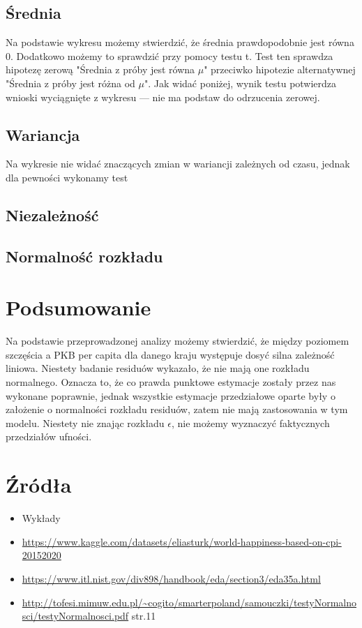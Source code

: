 \documentclass{article}
\theoremstyle{break}
\begin{document}
	\subsection{Średnia}
	Na podstawie wykresu możemy stwierdzić, że średnia prawdopodobnie jest równa 0. Dodatkowo możemy to sprawdzić przy pomocy testu t. Test ten sprawdza hipotezę zerową "Średnia z próby jest równa $\mu$" przeciwko hipotezie alternatywnej "Średnia z próby jest różna od $\mu$". Jak widać poniżej, wynik testu potwierdza wnioski wyciągnięte z wykresu — nie ma podstaw do odrzucenia zerowej.
	
	\subsection{Wariancja}
	Na wykresie nie widać znaczących zmian w wariancji zależnych od czasu, jednak dla pewności wykonamy test 
	
	\subsection{Niezależność}
	
	\subsection{Normalność rozkładu}
	
	
	\section{Podsumowanie}
	
	Na podstawie przeprowadzonej analizy możemy stwierdzić, że między poziomem szczęścia a PKB per capita dla danego kraju występuje dosyć silna zależność liniowa. Niestety badanie residuów wykazało, że nie mają one rozkładu normalnego. Oznacza to, że co prawda punktowe estymacje zostały przez nas wykonane poprawnie, jednak wszystkie estymacje przedziałowe oparte były o założenie o normalności rozkładu residuów, zatem nie mają zastosowania w tym modelu. Niestety nie znając rozkładu $\epsilon$, nie możemy wyznaczyć faktycznych przedziałów ufności.
	
	\section{Źródła}
	\begin{itemize}
		\item Wykłady
		\item \url{https://www.kaggle.com/datasets/eliasturk/world-happiness-based-on-cpi-20152020}
		\item \url{https://www.itl.nist.gov/div898/handbook/eda/section3/eda35a.html}
		\item \url{http://tofesi.mimuw.edu.pl/~cogito/smarterpoland/samouczki/testyNormalnosci/testyNormalnosci.pdf} str.11
		
	\end{itemize}
	
	
\end{document}
